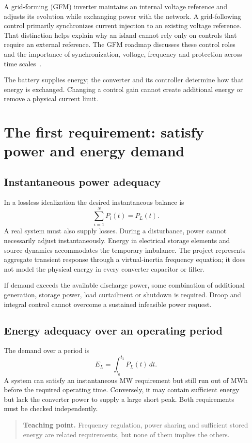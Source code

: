 \documentclass[11pt,a4paper]{article}
\newcommand{\lesson}[1]{\begin{quote}\textbf{Teaching point.} #1\end{quote}}
\begin{document}
A grid-forming (GFM) inverter maintains an internal voltage reference and adjusts its evolution while exchanging power with the network. A grid-following control primarily synchronizes current injection to an existing voltage reference. That distinction helps explain why an island cannot rely only on controls that require an external reference. The GFM roadmap discusses these control roles and the importance of synchronization, voltage, frequency and protection across time scales~\cite{roadmap}.

The battery supplies energy; the converter and its controller determine how that energy is exchanged. Changing a control gain cannot create additional energy or remove a physical current limit.

\section{The first requirement: satisfy power and energy demand}
\subsection{Instantaneous power adequacy}
In a lossless idealization the desired instantaneous balance is
\begin{equation}
\sum_{i=1}^{N}P_i(t)=P_L(t).
\end{equation}
A real system must also supply losses. During a disturbance, power cannot necessarily adjust instantaneously. Energy in electrical storage elements and source dynamics accommodates the temporary imbalance. The project represents aggregate transient response through a virtual-inertia frequency equation; it does not model the physical energy in every converter capacitor or filter.

If demand exceeds the available discharge power, some combination of additional generation, storage power, load curtailment or shutdown is required. Droop and integral control cannot overcome a sustained infeasible power request.

\subsection{Energy adequacy over an operating period}
The demand over a period is
\begin{equation}
E_L=\int_{t_0}^{t_1}P_L(t)\,dt.
\end{equation}
A system can satisfy an instantaneous MW requirement but still run out of MWh before the required operating time. Conversely, it may contain sufficient energy but lack the converter power to supply a large short peak. Both requirements must be checked independently.
\lesson{Frequency regulation, power sharing and sufficient stored energy are related requirements, but none of them implies the others.}
\end{document}
